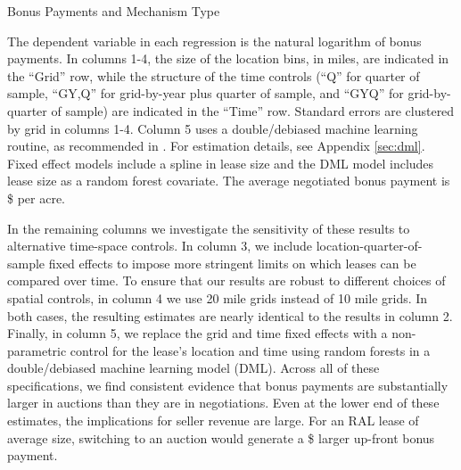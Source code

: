 \documentclass[12pt]{article}
\newcommand{\inputy}[1]{\unskip}
\begin{document}
\addtolength{\tabcolsep}{6pt}
\begin{table}[!htbp]
	\begin{center}
	\begin{threeparttable}
	\caption{Bonus Payments and Mechanism Type}
	\label{tab:table_main_bonus}
	\small
	            
	\footnotesize
		\begin{tablenotes}
			\item The dependent variable in each regression is the natural logarithm of bonus payments. In columns 1-4, the size of the location bins, in miles, are indicated in the ``Grid'' row, while the structure of the time controls (``Q'' for quarter of sample, ``GY,Q'' for grid-by-year plus quarter of sample, and ``GYQ'' for grid-by-quarter of sample) are indicated in the ``Time'' row.  Standard errors are clustered by grid in columns 1-4.  Column 5 uses a double/debiased machine learning routine, as recommended in \cite{chernozhukov2018double}.  For estimation details, see Appendix \ref{sec:dml}.  Fixed effect models include a spline in lease size and the DML model includes lease size as a random forest covariate.  The average negotiated bonus payment is \$\inputy{../output/estimates/negotiation_avg_bonus.tex} per acre.    
		\end{tablenotes}
	\end{threeparttable}
	\end{center}
\end{table}

In the remaining columns we investigate the sensitivity of these results to alternative time-space controls. In column 3, we include location-quarter-of-sample fixed effects to impose more stringent limits on which leases can be compared over time.  To ensure that our results are robust to different choices of spatial controls, in column 4 we use 20 mile grids instead of 10 mile grids.  In both cases, the resulting estimates are nearly identical to the results in column 2.  Finally, in column 5, we replace the grid and time fixed effects with a non-parametric control for the lease's location and time using random forests in a double/debiased machine learning model (DML). Across all of these specifications, we find consistent evidence that bonus payments are substantially larger in auctions than they are in negotiations. Even at the lower end of these estimates, the implications for seller revenue are large.  For an RAL lease of average size, switching to an auction would generate a \$\inputy{../output/estimates/Bonus_Grid10Yr_log_total.tex} larger up-front bonus payment. 
\end{document}
